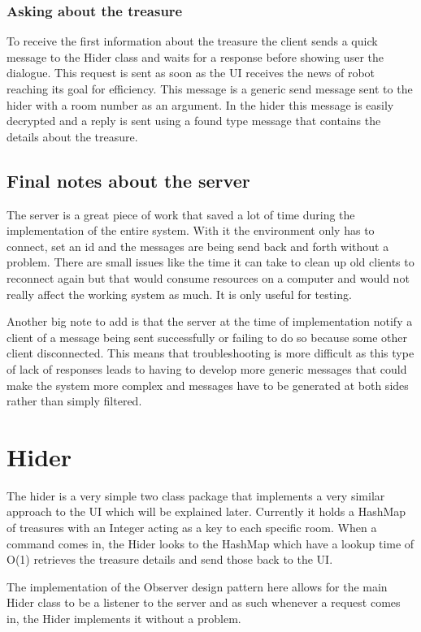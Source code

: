 \documentclass{report}
\begin{document}
        \subsubsection{Asking about the treasure}
          To receive the first information about the treasure the client sends a quick message to the Hider class and waits for a response before showing user the dialogue. This request is sent as soon as the UI receives the news of robot reaching its goal for efficiency. This message is a generic send message sent to the hider with a room number as an argument. In the hider this message is easily decrypted and a reply is sent using a found type message that contains the details about the treasure.

      \subsection{Final notes about the server}
        The server is a great piece of work that saved a lot of time during the implementation of the entire system. With it the environment only has to connect, set an id and the messages are being send back and forth without a problem. There are small issues like the time it can take to clean up old clients to reconnect again but that would consume resources on a computer and would not really affect the working system as much. It is only useful for testing.

        Another big note to add is that the server at the time of implementation notify a client of a message being sent successfully or failing to do so because some other client disconnected. This means that troubleshooting is more difficult as this type of lack of responses leads to having to develop more generic messages that could make the system more complex and messages have to be generated at both sides rather than simply filtered.

    \section{Hider}
      The hider is a very simple two class package that implements a very similar approach to the UI which will be explained later. Currently it holds a HashMap of treasures with an Integer acting as a key to each specific room. When a command comes in, the Hider looks to the HashMap which have a lookup time of O(1) retrieves the treasure details and send those back to the UI.

      The implementation of the Observer design pattern here allows for the main Hider class to be a listener to the server and as such whenever a request comes in, the Hider implements it without a problem.
\end{document}
